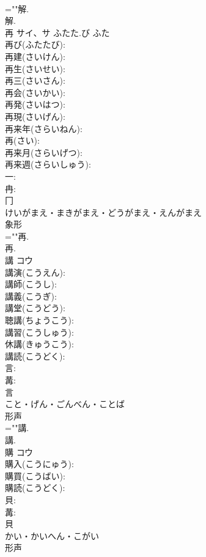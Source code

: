 \documentclass[8pt]{extreport}
\begin{document}
\begin{CJK}{UTF8}{min}
\\	=""解.
\\	解.
\\	再	サイ、サ	ふたた.び	ふた	
\\	再び(ふたたび): 
\\	再建(さいけん): 
\\	再生(さいせい): 
\\	再三(さいさん): 
\\	再会(さいかい): 
\\	再発(さいはつ): 
\\	再現(さいげん): 
\\	再来年(さらいねん): 
\\	再(さい): 
\\	再来月(さらいげつ): 
\\	再来週(さらいしゅう): 
\\	一: 
\\	冉: 
\\	冂	
\\	けいがまえ・まきがまえ・どうがまえ・えんがまえ	
\\	象形 
\\	=""再.
\\	再.
\\	講	コウ			
\\	講演(こうえん): 
\\	講師(こうし): 
\\	講義(こうぎ): 
\\	講堂(こうどう): 
\\	聴講(ちょうこう): 
\\	講習(こうしゅう): 
\\	休講(きゅうこう): 
\\	講読(こうどく): 
\\	言: 
\\	冓: 
\\	言	
\\	こと・げん・ごんべん・ことば	
\\	形声 
\\	=""講.
\\	講.
\\	購	コウ			
\\	購入(こうにゅう): 
\\	購買(こうばい): 
\\	購読(こうどく): 
\\	貝: 
\\	冓: 
\\	貝	
\\	かい・かいへん・こがい	
\\	形声 

\end{CJK}
\end{document}
